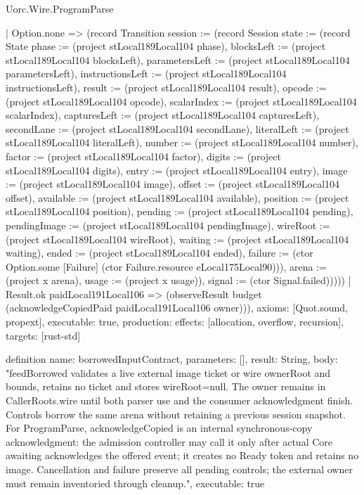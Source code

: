 \begin{lexlean}{Uorc.Wire.ProgramParse}
\begin{semanticmodule}
{        | Option.none => (record Transition {session := (record Session {state := (record State {phase := (project stLocal189Local104 phase), blocksLeft := (project stLocal189Local104 blocksLeft), parametersLeft := (project stLocal189Local104 parametersLeft), instructionsLeft := (project stLocal189Local104 instructionsLeft), result := (project stLocal189Local104 result), opcode := (project stLocal189Local104 opcode), scalarIndex := (project stLocal189Local104 scalarIndex), capturesLeft := (project stLocal189Local104 capturesLeft), secondLane := (project stLocal189Local104 secondLane), literalLeft := (project stLocal189Local104 literalLeft), number := (project stLocal189Local104 number), factor := (project stLocal189Local104 factor), digits := (project stLocal189Local104 digits), entry := (project stLocal189Local104 entry), image := (project stLocal189Local104 image), offset := (project stLocal189Local104 offset), available := (project stLocal189Local104 available), position := (project stLocal189Local104 position), pending := (project stLocal189Local104 pending), pendingImage := (project stLocal189Local104 pendingImage), wireRoot := (project stLocal189Local104 wireRoot), waiting := (project stLocal189Local104 waiting), ended := (project stLocal189Local104 ended), failure := (ctor Option.some [Failure] (ctor Failure.resource eLocal175Local90))}), arena := (project x arena), usage := (project x usage)}), signal := (ctor Signal.failed)}))))
    | Result.ok paidLocal191Local106 => (observeResult budget (acknowledgeCopiedPaid paidLocal191Local106 owner))),
  axioms: [Quot.sound, propext],
  executable: true,
  production: {effects: [allocation, overflow, recursion], targets: [rust-std]}
}

definition{
  name: borrowedInputContract,
  parameters: [],
  result: String,
  body: "feedBorrowed validates a live external image ticket or wire ownerRoot and bounds, retains no ticket and stores wireRoot=null. The owner remains in CallerRoots.wire until both parser use and the consumer acknowledgment finish. Controls borrow the same arena without retaining a previous session snapshot. For ProgramParse, acknowledgeCopied is an internal synchronous-copy acknowledgment: the admission controller may call it only after actual Core awaiting acknowledges the offered event; it creates no Ready token and retains no image. Cancellation and failure preserve all pending controls; the external owner must remain inventoried through cleanup.",
  executable: true
}
\end{semanticmodule}
\end{lexlean}
